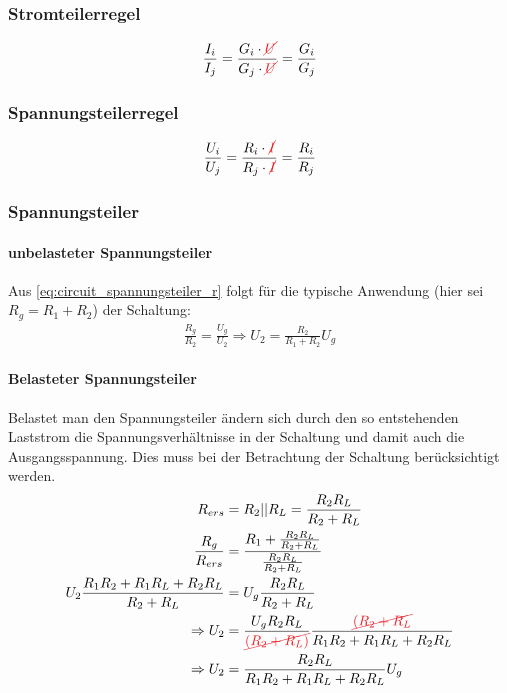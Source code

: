 \documentclass[12pt,a4paper]{article}%
\numberwithin{equation}{section}
\newcommand{\subsubsubsection}{\paragraph}
\def\colRed#1{\begingroup\color{Red}{#1}\endgroup}
\begin{document}
\subsubsection{Stromteilerregel}
\begin{align}
\frac{I_i}{I_j} = \frac{G_i \cdot \colRed{\cancel{U}}}{G_j \cdot \colRed{\cancel{U}}} = \frac{G_i}{G_j} \label{eq:circuit_stromteiler_r}
\end{align}

\subsubsection{Spannungsteilerregel}
\begin{align}
\frac{U_i}{U_j} = \frac{R_i \cdot \colRed{\cancel{I}}}{R_j \cdot \colRed{\cancel{I}}} = \frac{R_i}{R_j} \label{eq:circuit_spannungsteiler_r}
\end{align}

\subsubsection{Spannungsteiler}
\subsubsubsection{unbelasteter Spannungsteiler}
Aus \eqref{eq:circuit_spannungsteiler_r} folgt für die typische Anwendung (hier sei $R_g = R_1 + R_2$) der Schaltung:
\begin{align}
\frac{R_g}{R_2} = \frac{U_g}{U_2} \Rightarrow U_2 = \frac{R_2}{R_1 + R_2} U_g \label{eq:circuit_spannungsteiler_unb}
\end{align}

\subsubsubsection{Belasteter Spannungsteiler}
Belastet man den Spannungsteiler ändern sich durch den so entstehenden Laststrom die Spannungsverhältnisse in der Schaltung und damit auch die Ausgangsspannung. Dies muss bei der Betrachtung der Schaltung berücksichtigt werden.
\begin{align}
R_{ers} &= R_2 || R_L = \frac{R_2 R_L}{R_2 + R_L} \nonumber \\ 
\frac{R_g}{R_{ers}} &= \frac{R_1 + \frac{R_2 R_L}{R_2 + R_L}}{\frac{R_2 R_L}{R_2 + R_L}} \nonumber \\
U_2 \frac{R_1 R_2 + R_1 R_L + R_2 R_L}{R_2 + R_L} &= U_g \frac{R_2 R_L}{R_2 + R_L} \nonumber \\
\Rightarrow U_2 &= \frac{U_g R_2 R_L}{\colRed{\cancel{(R_2 + R_L)}}} \frac{\colRed{\cancel{(R_2 + R_L}}}{R_1 R_2 + R_1 R_L + R_2 R_L} \nonumber \\
\Rightarrow U_2 &= \frac{R_2 R_L}{R_1 R_2 + R_1 R_L + R_2 R_L} U_g \label{eq:circuitl_spannungsteiler_bel}
\end{align}
\end{document}
